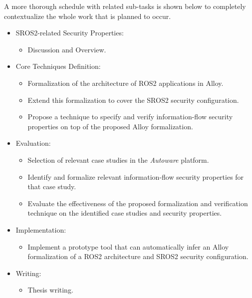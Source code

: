 A more thorough schedule with related sub-tasks is shown below to completely contextualize the whole work that is planned to occur.

\begin{itemize}
\item SROS2-related Security Properties:
    \begin{itemize}
        \item Discussion and Overview.
    \end{itemize}

\item Core Techniques Definition:
    \begin{itemize}
        \item Formalization of the architecture of ROS2 applications in Alloy.
        \item Extend this formalization to cover the SROS2 security configuration.
        \item Propose a technique to specify and verify information-flow security properties on top of the proposed Alloy formalization.
    \end{itemize}

\item Evaluation:
    \begin{itemize}
        \item Selection of relevant case studies in the \textit{Autoware} platform.
        \item Identify and formalize relevant information-flow security properties for that case study.
        \item Evaluate the effectiveness of the proposed formalization and verification technique on the identified case studies and security properties.
    \end{itemize}

\item Implementation:
    \begin{itemize}
        \item Implement a prototype tool that can automatically infer an Alloy formalization of a ROS2 architecture and SROS2 security configuration.
    \end{itemize}

\item Writing:
    \begin{itemize}
        \item Thesis writing.
    \end{itemize}
\end{itemize}